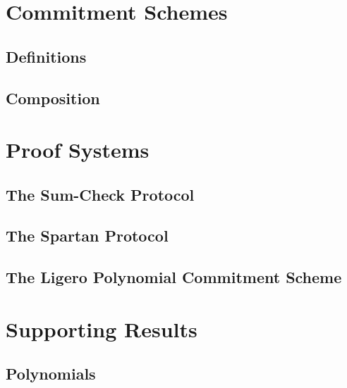 

\chapter{Commitment Schemes}

\section{Definitions}

\section{Composition}



\chapter{Proof Systems}

\section{The Sum-Check Protocol}

\section{The Spartan Protocol}

\section{The Ligero Polynomial Commitment Scheme}


\chapter{Supporting Results}

\section{Polynomials}

